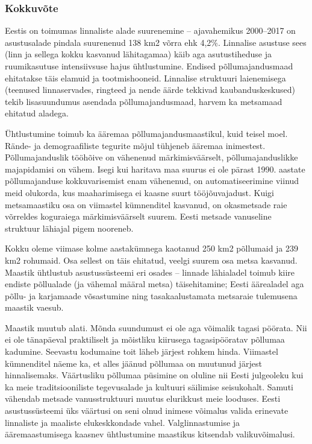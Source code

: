 \documentclass[estonian,]{article}
\begin{document}
\hypertarget{kokkuvuxf5te}{%
\subsubsection*{Kokkuvõte}\label{kokkuvuxf5te}}

Eestis on toimumas linnaliste alade suurenemine -- ajavahemikus 2000--2017 on asustusalade pindala suurenenud 138 km2 võrra ehk 4,2\%. Linnalise asustuse sees (linn ja sellega kokku kasvanud lähitagamaa) käib aga asutustiheduse ja ruumikasutuse intensiivsuse hajus ühtlustumine. Endised põllumajandusmaad ehitatakse täis elamuid ja tootmishooneid. Linnalise struktuuri laienemisega (teenused linnaservades, ringteed ja nende äärde tekkivad kaubanduskeskused) tekib lisasuundumus asendada põllumajandusmaad, harvem ka metsamaad ehitatud aladega.

Ühtlustumine toimub ka ääremaa põllumajandusmaastikul, kuid teisel moel. Rände- ja demograafiliste tegurite mõjul tühjeneb ääremaa inimestest. Põllumajanduslik tööhõive on vähenenud märkimisväärselt, põllumajanduslikke majapidamisi on vähem. Isegi kui haritava maa suurus ei ole pärast 1990. aastate põllumajanduse kokkuvarisemist enam vähenenud, on automatiseerimine viinud meid olukorda, kus maaharimisega ei kaasne suurt tööjõuvajadust. Kuigi metsamaastiku osa on viimastel kümnenditel kasvanud, on okasmetsade raie võrreldes koguraiega märkimisväärselt suurem. Eesti metsade vanuseline struktuur lähiajal pigem nooreneb.

Kokku oleme viimase kolme aastakümnega kaotanud 250 km2 põllumaid ja 239 km2 rohumaid. Osa sellest on täis ehitatud, veelgi suurem osa metsa kasvanud. Maastik ühtlustub asustussüsteemi eri osades -- linnade lähialadel toimub kiire endiste põllualade (ja vähemal määral metsa) täisehitamine; Eesti äärealadel aga põllu- ja karjamaade võsastumine ning tasakaalustamata metsaraie tulemusena maastik vaesub.

Maastik muutub alati. Mõnda suundumust ei ole aga võimalik tagasi pöörata. Nii ei ole tänapäeval praktiliselt ja mõistliku kiirusega tagasipööratav põllumaa kadumine. Seevastu kodumaine toit läheb järjest rohkem hinda. Viimastel kümnenditel näeme ka, et alles jäänud põllumaa on muutunud järjest hinnalisemaks. Väärtusliku põllumaa püsimine on oluline nii Eesti julgeoleku kui ka meie traditsiooniliste tegevusalade ja kultuuri säilimise seisukohalt. Samuti vähendab metsade vanusstruktuuri muutus elurikkust meie looduses. Eesti asustussüsteemi üks väärtusi on seni olnud inimese võimalus valida erinevate linnaliste ja maaliste elukeskkondade vahel. Valglinnastumise ja ääremaastumisega kaasnev ühtlustumine maastikus kitsendab valikuvõimalusi.
\end{document}
